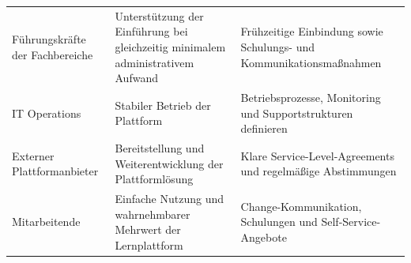\begin{xltabular}{\textwidth}{@{}>{\hsize}X>{\hsize}X>{\hsize}X@{}}
	Führungskräfte der Fachbereiche &
	Unterstützung der Einführung bei gleichzeitig minimalem administrativem Aufwand &
	Frühzeitige Einbindung sowie Schulungs- und Kommunikationsmaßnahmen \\

	\acs{IT} Operations &
	Stabiler Betrieb der Plattform &
	Betriebsprozesse, Monitoring und Supportstrukturen definieren \\

	Externer Plattformanbieter &
	Bereitstellung und Weiterentwicklung der Plattformlösung &
	Klare Service-Level-Agreements und regelmäßige Abstimmungen \\

	Mitarbeitende &
	Einfache Nutzung und wahrnehmbarer Mehrwert der Lernplattform &
	Change-Kommunikation, Schulungen und Self-Service-Angebote \\

\end{xltabular}
